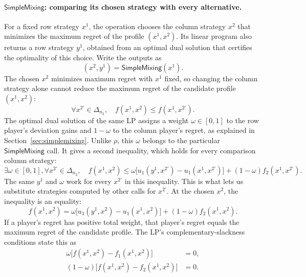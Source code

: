 \documentclass[11pt]{article}
\theoremstyle{remark}
\theoremstyle{plain}
\newcommand{\sm}{\mathsf{SimpleMixing}}
\begin{document}
\paragraph{\texorpdfstring{$\sm$}{SimpleMixing}: comparing its chosen strategy with every alternative.}
For a fixed row strategy $x^1$, the operation chooses the column
strategy $x^2$ that minimizes the maximum regret of the profile
$(x^1,x^2)$. Its linear program also returns a row strategy $y^1$,
obtained from an optimal dual solution that certifies the optimality
of this choice.
Write the outputs as
\[
 (x^2,y^1)=\sm(x^1).
\]
The chosen $x^2$ minimizes maximum regret with $x^1$ fixed, so changing the column strategy alone
cannot reduce the maximum regret of the candidate profile $(x^1,x^2)$:
\begin{equation}
 \forall x^{2\prime}\in\Delta_{n_2},\quad
 f(x^1,x^2)\le f(x^1,x^{2\prime}).
 \label{eq:properties-primal}
\end{equation}
The optimal dual solution of the same LP assigns a weight
$\omega\in[0,1]$ to the row player's deviation gains and $1-\omega$
to the column player's regret, as explained in
Section~\ref{sec:simplemixing}. Unlike
$\rho$, this $\omega$ belongs to the particular $\sm$ call. It
gives a second inequality, which holds for every comparison column strategy:
\begin{equation}
 \exists\omega\in[0,1],\forall x^{2\prime}\in\Delta_{n_2},\quad
 f(x^1,x^2)\le
 \omega\bigl[u_1(y^1,x^{2\prime})-u_1(x^1,x^{2\prime})\bigr]
 +(1-\omega)f_2(x^1,x^{2\prime}).
 \label{eq:properties-dual}
\end{equation}
The same $y^1$ and $\omega$ work for every $x^{2\prime}$ in this
inequality. This is what lets us substitute strategies computed by
other calls for $x^{2\prime}$. At the chosen $x^2$, the inequality
is an equality:
\begin{equation}
 f(x^1,x^2)=
 \omega\bigl[u_1(y^1,x^2)-u_1(x^1,x^2)\bigr]
 +(1-\omega)f_2(x^1,x^2).
 \label{eq:properties-strong-duality}
\end{equation}
If a player's regret has positive total weight, that player's regret
equals the maximum regret of the candidate profile. The LP's complementary-slackness
conditions state this as
\begin{equation}
 \begin{aligned}
  \omega\bigl[f(x^1,x^2)-f_1(x^1,x^2)\bigr]&=0,\\
  (1-\omega)\bigl[f(x^1,x^2)-f_2(x^1,x^2)\bigr]&=0.
 \end{aligned}
 \label{eq:properties-cs}
\end{equation}
\end{document}
